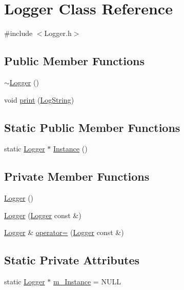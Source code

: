 \hypertarget{classLogger}{\section{\-Logger \-Class \-Reference}
\label{classLogger}
}


{\ttfamily \#include $<$\-Logger.\-h$>$}

\subsection*{\-Public \-Member \-Functions}
\begin{DoxyCompactItemize}
\item 
\hyperlink{classLogger_acb668a9e186a25fbaad2e4af6d1ed00a}{$\sim$\-Logger} ()
\item 
void \hyperlink{classLogger_a61691525efbcb21337e37b28bcedc982}{print} (\hyperlink{Logger_8h_a37601483630df382986fba4887e536bd}{\-Log\-String})
\end{DoxyCompactItemize}
\subsection*{\-Static \-Public \-Member \-Functions}
\begin{DoxyCompactItemize}
\item 
static \hyperlink{classLogger}{\-Logger} $\ast$ \hyperlink{classLogger_afae0bf19389387a916656073572cb846}{\-Instance} ()
\end{DoxyCompactItemize}
\subsection*{\-Private \-Member \-Functions}
\begin{DoxyCompactItemize}
\item 
\hyperlink{classLogger_abc41bfb031d896170c7675fa96a6b30c}{\-Logger} ()
\item 
\hyperlink{classLogger_a21340fb1037a0f71c0dc659ea33678a4}{\-Logger} (\hyperlink{classLogger}{\-Logger} const \&)
\item 
\hyperlink{classLogger}{\-Logger} \& \hyperlink{classLogger_a26fa369e27132ca4bf478710919f6e70}{operator=} (\hyperlink{classLogger}{\-Logger} const \&)
\end{DoxyCompactItemize}
\subsection*{\-Static \-Private \-Attributes}
\begin{DoxyCompactItemize}
\item 
static \hyperlink{classLogger}{\-Logger} $\ast$ \hyperlink{classLogger_a1b2d5c8754e1f4f5aca49e75b0c8357c}{m\-\_\-\-Instance} = \-N\-U\-L\-L
\end{DoxyCompactItemize}


